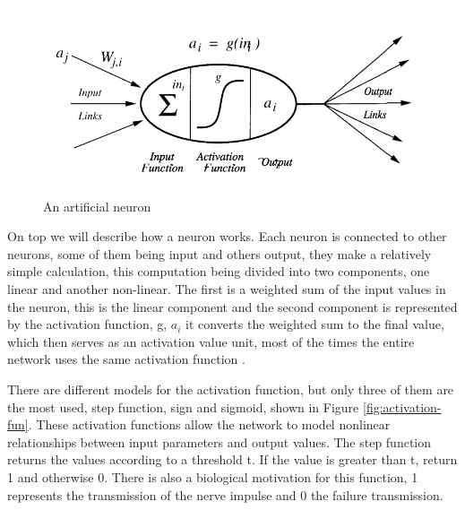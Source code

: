  \begin{figure}[htbp]
	\centerline{\includegraphics[scale=0.75]{fig/un-neuron.png}}  
  \caption{An artificial neuron  \cite{book.neuronal.network.1995}}
  \label{fig:anneuron}
  
\end{figure}

On top we will describe how a neuron works. Each neuron is connected to other neurons, 
some of them being input and others output, they make a relatively simple calculation, 
this computation being divided into two components, one linear and another non-linear. 
The first is a weighted sum of the input values in the neuron, this is the linear component and the 
second component is represented by the activation function, g, $a_i$
it converts the weighted sum to the final value, which then serves as an activation value unit,
 most of the times the entire network uses the same activation function \cite{book.neuronal.network.1995}. 


 There are different models for the activation function, but only three of them are the most used, step function,
  sign and sigmoid, shown in Figure \ref{fig:activation-fun}. These activation functions allow the network to model nonlinear relationships between input parameters and output values. The step function returns the values according to a threshold t. If the value is greater than t, return 1 and otherwise 0. There is also a biological motivation for this function, 1 represents the transmission of the nerve impulse and 0 the failure transmission.

